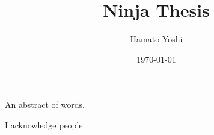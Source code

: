 \usepackage[style=alphabetic,natbib=true]{biblatex}
\usepackage{lipsum}




\title{Ninja Thesis}
\author{Hamato Yoshi}

\date{\origdate\today}

\address{%
First Line\\
Second Line\\
Third Line\\
\url{http://www.somewhere.com}
}







\maketitle
\frontmatter
\begin{theabstract}
An abstract of words.
\end{theabstract}

\makedeclaration{} %
\makecopyrightnoembargo{} %


\begin{acknowledgements}
I acknowledge people.

\end{acknowledgements}

